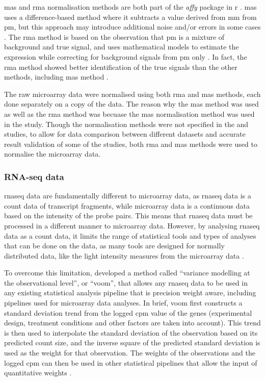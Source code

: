 \Gls{mas} and \gls{rma} normalisation methods are both part of the \textit{affy} package in \gls{r} \citep{Gautier2004}.
\Gls{mas} uses a difference-based method where it subtracts a value derived from \gls{mm} from \gls{pm}, but this approach may introduce additional noise and/or errors in some cases \citep{Irizarry2003}.
The \gls{rma} method is based on the observation that \gls{pm} is a mixture of background and true signal, and uses mathematical models to estimate the expression while correcting for background signals from \gls{pm} only \citep{Irizarry2003}.
In fact, the \gls{rma} method showed better identification of the true signals than the other methods, including \Gls{mas} method \citep{Irizarry2003}.

The raw microarray data were normalised using both \gls{rma} and \gls{mas} methods, each done separately on a copy of the data.
The reason why the \gls{mas} method was used as well as the \gls{rma} method was becuase the \gls{mas} normalisation method was used in the \citet{Gatza2010a} study.
Though the normalisation methods were not specified in the \citet{Creighton2012} and \citet{Fuentes-Mattei2014} studies, to allow for data comparison between different datasets and accurate result validation of some of the studies, both \gls{rma} and \gls{mas} methods were used to normalise the microarray data.

\subsubsection{RNA-seq data}
\label{ssub:rna_seq_data}

\gls{rnaseq} data are fundamentally different to microarray data, as \gls{rnaseq} data is a count data of transcript fragments, while microarray data is a continuous data based on the intensity of the probe pairs.
This means that \gls{rnaseq} data must be processed in a different manner to microarray data.
However, by analysing \gls{rnaseq} data as a count data, it limits the range of statistical tools and types of analyses that can be done on the data, as many tools are designed for normally distributed data, like the light intensity measures from the microarray data \citep{Law2014}.

To overcome this limitation, \citet{Law2014} developed a method called ``variance modelling at the observational level'', or ``voom'', that allows any \gls{rnaseq} data to be used in any existing statistical analysis pipeline that is precision weight aware, including pipelines used for microarray data analyses.
In brief, voom first constructs a standard deviation trend from the logged \gls{cpm} value of the genes (experimental design, treatment conditions and other factors are taken into account).
This trend is then used to interpolate the standard deviation of the observation based on its predicted count size, and the inverse square of the predicted standard deviation is used as the weight  for that observation.
The weights of the observations and the logged \gls{cpm} can then be used in other statistical pipelines that allow the input of quantitative weights \citep{Law2014}.

